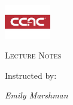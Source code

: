 \documentclass[a4paper,11pt,twoside]{report}
\begin{document}
{\centering
	\includegraphics[width=0.15\textwidth]{../../../.banner/banner.jpg}\par\vspace{1cm}
	{\scshape\LARGE Lecture Notes \par}\vspace{1cm}{\huge\bfseries Physics 2\par}
	\vspace{.5cm}{\large Fall 2020 \par}\vspace{.5cm}{\Large\itshape Jasper Runco \par}
	\vfill Instructed by: \par{\large \itshape Emily Marshman  \par}} \newpage \tableofcontents \pagestyle{plain}
	
	
	
	
	
	
\end{document}
